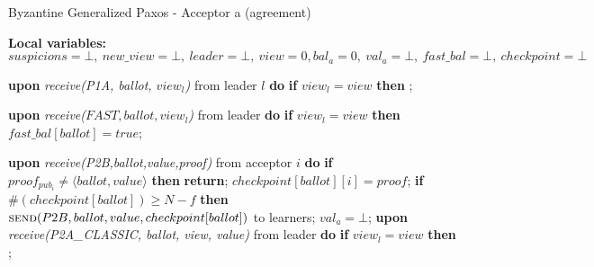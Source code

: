 \begin{algorithm} 
	\caption{Byzantine Generalized Paxos - Acceptor a (agreement)}
	\label{BFT-Acc}
	\textbf{Local variables:} $suspicions = \bot,\ new\_view = \bot,\ leader = \bot,\ view = 0, bal_a = 0,\ val_a = \bot,\ fast\_bal = \bot,\ checkpoint=\bot$
	\vspace*{-.5cm}
	\begin{multicols}{2}
		\begin{algorithmic}[1]
			\State \textbf{upon} \textit{receive(P1A, ballot, $view_l$)} from leader $l$ \textbf{do}
			\State \hspace{\algorithmicindent} \textbf{if} $view_l = view$ \textbf{then}
			\State \hspace{\algorithmicindent}\hspace{\algorithmicindent} ;
			
			\State
			\State \textbf{upon} \textit{receive($FAST,ballot,view_l$)} from leader \textbf{do}
			\State \hspace{\algorithmicindent} \textbf{if} $view_l = view$ \textbf{then}
			\State \hspace{\algorithmicindent}\hspace{\algorithmicindent} $fast\_bal[ballot] = true$;
			
			\State
			\State \textbf{upon} \textit{receive(P2B,ballot,value,proof)} from acceptor $i$ \textbf{do}
			\State \hspace{\algorithmicindent} \textbf{if} $proof_{pub_i} \neq \langle ballot, value \rangle$ \textbf{then}
			\State \hspace{\algorithmicindent}\hspace{\algorithmicindent} \textbf{return};
			\State \hspace{\algorithmicindent} $checkpoint[ballot][i] = proof$;
			\State \hspace{\algorithmicindent} \textbf{if} $\#(checkpoint[ballot]) \geq N-f$ \textbf{then}
			\State \hspace{\algorithmicindent}\hspace{\algorithmicindent} $\Call{send}{P2B, ballot, value, checkpoint[ballot]}$ to learners;
			\State \hspace{\algorithmicindent}\hspace{\algorithmicindent} $val_a = \bot$;
			\State
			\State \textbf{upon} \textit{receive(P2A\_CLASSIC, ballot, view, value)} from leader \textbf{do}
			\State \hspace{\algorithmicindent} \textbf{if} $view_l = view$ \textbf{then}
			\State \hspace{\algorithmicindent}\hspace{\algorithmicindent} ; 
			

\end{algorithmic}
\end{multicols}
\end{algorithm}
